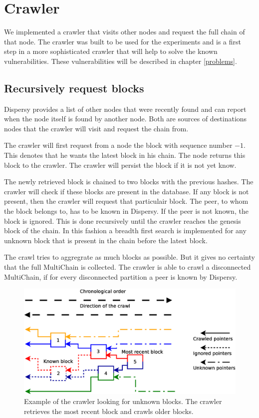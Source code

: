 \section{Crawler}
We implemented a crawler that visits other nodes and request the full chain of that node.
The crawler was built to be used for the experiments and
is a first step in a more sophisticated crawler that will help to solve the known vulnerabilities.
These vulnerabilities will be described in chapter \ref{problems}.

\subsection{Recursively request blocks}
Dispersy provides a list of other nodes that were recently found
and can report when the node itself is found by another node.
Both are sources of destinations nodes that the crawler will visit
and request the chain from.

The crawler will first request from a node the block with sequence number $-1$.
This denotes that he wants the latest block in his chain.
The node returns this block to the crawler.
The crawler will persist the block if it is not yet know.

The newly retrieved block is chained to two blocks with the previous hashes.
The crawler will check if these blocks are present in the database.
If any block is not present,
then the crawler will request that particulair block.
The peer, to whom the block belongs to, has to be known in Dispersy.
If the peer is not known, the block is ignored.
This is done recursively until the crawler reaches the genesis block of the chain.
In this fashion a breadth first search is implemented for any unknown block
that is present in the chain before the latest block.

The crawl tries to aggregrate as much blocks as possible.
But it gives no certainty that the full MultiChain is collected.
The crawler is able to crawl a disconnected MultiChain,
if for every disconnected partition a peer is known by Dispersy.

\begin{figure}
	\centerline{\includegraphics[scale=0.44]{design/figs/crawler-version2.eps}}
	\caption{Example of the crawler looking for unknown blocks. The crawler retrieves the most recent block and crawls older blocks.}
	\label{fig:crawler-example}
\end{figure}

